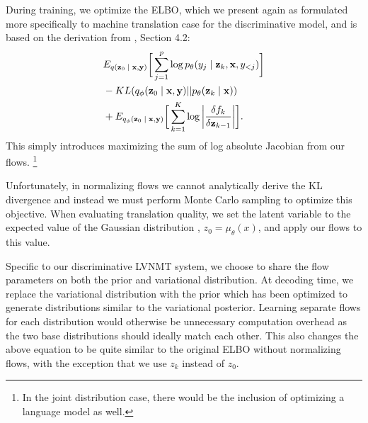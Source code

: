 During training, we optimize the \ac{ELBO}, which we present again as formulated more specifically to machine translation case for the discriminative model, and is based on the derivation from \citet{rezende2015VIwithNF}, Section 4.2:
\begin{align}
\begin{split}\label{eq:2}
&
E_{q(\textbf{z}_{0}\; | \;{\textbf{x}, \textbf{y}})} \bigg[ \sum_{j=1}^{p} \log p_{\theta}(y_{j} \; | \;{\textbf{z}_{k}}, \textbf{x}, y_{<j}) \bigg] \\
& - KL(q_{\phi}(\textbf{z}_{0} \; | \;{\textbf{x}, \textbf{y}}) || p_{\theta}(\textbf{z}_{k} \; | \;{\textbf{x}})) \\
&   +  E_{q_{\phi}(\textbf{z}_{0} \; | \;{\textbf{x}, \textbf{y}})} \bigg[\sum_{k=1}^{K} \log \bigg|\frac{\delta f_{k}}{\delta \textbf{z}_{k-1}} \bigg| \bigg].
\end{split}
\end{align}
This simply introduces maximizing the sum of  log absolute Jacobian from our flows. \footnote{In the joint distribution case, there would be the inclusion of optimizing a language model as well.}

Unfortunately, in normalizing flows we cannot analytically derive the KL divergence and instead we must perform Monte Carlo sampling to optimize this objective. When evaluating translation quality, we set the latent variable to the expected value of the Gaussian distribution , $z_{0} = \mu_{\theta}(x)$, and apply our flows to this value.

Specific to our discriminative \ac{LVNMT} system, we choose to share the flow parameters on both the prior and variational distribution. At decoding time, we replace the variational distribution with the prior which has been optimized to generate distributions similar to the variational posterior. Learning separate flows for each distribution would otherwise be unnecessary computation overhead as the two base distributions should ideally match each other. This also changes the above equation to be quite similar to the original \ac{ELBO} without normalizing flows, with the exception that we use $z_{k}$ instead of $z_{0}$.








